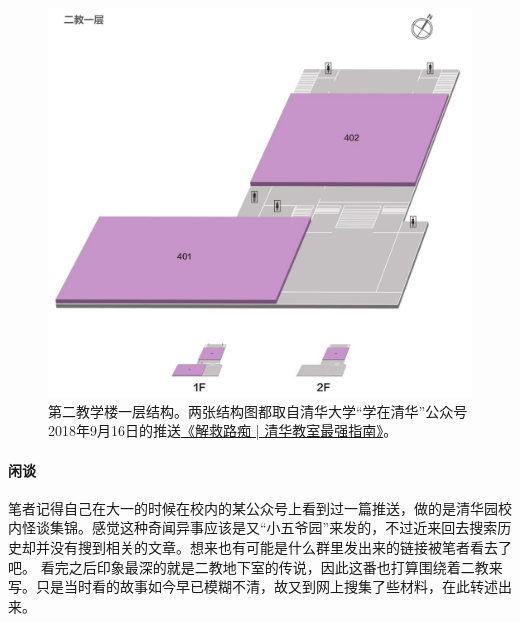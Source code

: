 \begin{figure}[!t]
	\centering
	\includegraphics[width=\linewidth]{figures/二教一层.jpg}
	第二教学楼一层结构。两张结构图都取自清华大学“学在清华”公众号2018年9月16日的推送\href{https://mp.weixin.qq.com/s/SHW-wviq3NYemcHZBRgi5w}{《解救路痴 | 清华教室最强指南》}。
\end{figure}

\vfill

\paragraph{闲谈}
笔者记得自己在大一的时候在校内的某公众号上看到过一篇推送，做的是清华园校内怪谈集锦。感觉这种奇闻异事应该是又“小五爷园”来发的，不过近来回去搜索历史却并没有搜到相关的文章。想来也有可能是什么群里发出来的链接被笔者看去了吧。
看完之后印象最深的就是二教地下室的传说，因此这番也打算围绕着二教来写。只是当时看的故事如今早已模糊不清，故又到网上搜集了些材料，在此转述出来。

